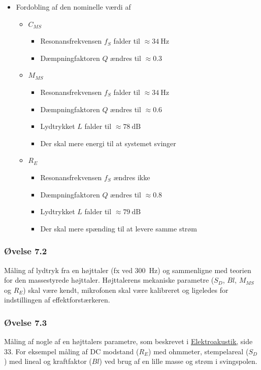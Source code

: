 \newpage
\begin{itemize}
	\item Fordobling af den nominelle værdi af 
	\begin{itemize}
		\item $C_{MS}$
		\begin{itemize}
			\item Resonansfrekvensen $f_S$ falder til $\approx\SI{34}{\hertz}$
			\item Dæmpningfaktoren $Q$ ændres til $\approx 0.3$
		\end{itemize}
		\item $M_{MS}$
		\begin{itemize}
			\item Resonansfrekvensen $f_S$ falder til $\approx\SI{34}{\hertz}$
			\item Dæmpningfaktoren $Q$ ændres til $\approx 0.6$
			\item Lydtrykket $L$ falder til $\approx \SI{78}{\deci\bel}$
			\item Der skal mere energi til at systemet svinger
		\end{itemize} 
		\item $R_E$
		\begin{itemize}
			\item Resonansfrekvensen $f_S$ ændres ikke
			\item Dæmpningfaktoren $Q$ ændres til $\approx 0.8$
			\item Lydtrykket $L$ falder til $\approx \SI{79}{\deci\bel}$
			\item Der skal mere spænding til at levere samme strøm
		\end{itemize}
	\end{itemize}
\end{itemize}

\subsubsection{Øvelse 7.2}
Måling af lydtryk fra en højttaler (fx ved \SI{300}{\hertz}) og sammenligne med teorien for den massestyrede højttaler. Højttalerens mekaniske parametre ($S_D$, $Bl$, $M_{MS}$ og $R_E$) skal være kendt, mikrofonen skal være kalibreret og ligeledes for indstillingen af effektforstærkeren.

\subsubsection{Øvelse 7.3}
Måling af nogle af en højttalers parametre, som beskrevet i \href{http://www.torean.dk/artikel/Elektroakustik.pdf}{Elektroakustik,} side 33. For eksempel måling af DC modstand ($R_E$) med ohmmeter, stempelareal ($S_D$) med lineal og kraftfaktor ($Bl$) ved brug af en lille masse og strøm i svingspolen.
